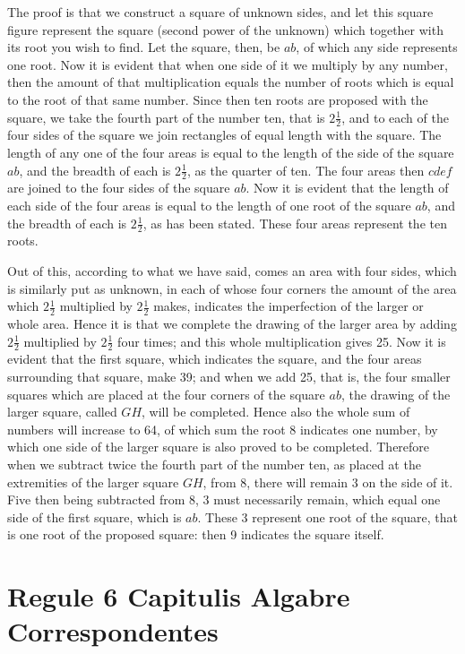 \documentclass[11pt,a4paper]{book}
\begin{document}
The proof is that we construct a square of unknown sides, and let this square figure represent the square (second power of the unknown) which together with its root you wish to find. Let the square, then, be $ab$, of which any side represents one root. Now it is evident that when one side of it we multiply by any number, then the amount of that multiplication equals the number of roots which is equal to the root of that same number. Since then ten roots are proposed with the square, we take the fourth part of the number ten, that is $2\frac{1}{2}$, and to each of the four sides of the square we join rectangles of equal length with the square. The length of any one of the four areas is equal to the length of the side of the square $ab$, and the breadth of each is $2\frac{1}{2}$, as the quarter of ten. The four areas then $cdef$ are joined to the four sides of the square $ab$. Now it is evident that the length of each side of the four areas is equal to the length of one root of the square $ab$, and the breadth of each is $2\frac{1}{2}$, as has been stated. These four areas represent the ten roots.

Out of this, according to what we have said, comes an area with four sides, which is similarly put as unknown, in each of whose four corners the amount of the area which $2\frac{1}{2}$ multiplied by $2\frac{1}{2}$ makes, indicates the imperfection of the larger or whole area. Hence it is that we complete the drawing of the larger area by adding $2\frac{1}{2}$ multiplied by $2\frac{1}{2}$ four times; and this whole multiplication gives 25. Now it is evident that the first square, which indicates the square, and the four areas surrounding that square, make 39; and when we add 25, that is, the four smaller squares which are placed at the four corners of the square $ab$, the drawing of the larger square, called $GH$, will be completed. Hence also the whole sum of numbers will increase to 64, of which sum the root 8 indicates one number, by which one side of the larger square is also proved to be completed. Therefore when we subtract twice the fourth part of the number ten, as placed at the extremities of the larger square $GH$, from 8, there will remain 3 on the side of it. Five then being subtracted from 8, 3 must necessarily remain, which equal one side of the first square, which is $ab$. These 3 represent one root of the square, that is one root of the proposed square: then 9 indicates the square itself.

\chapter*{Regule 6 Capitulis Algabre\\ Correspondentes}
\end{document}

